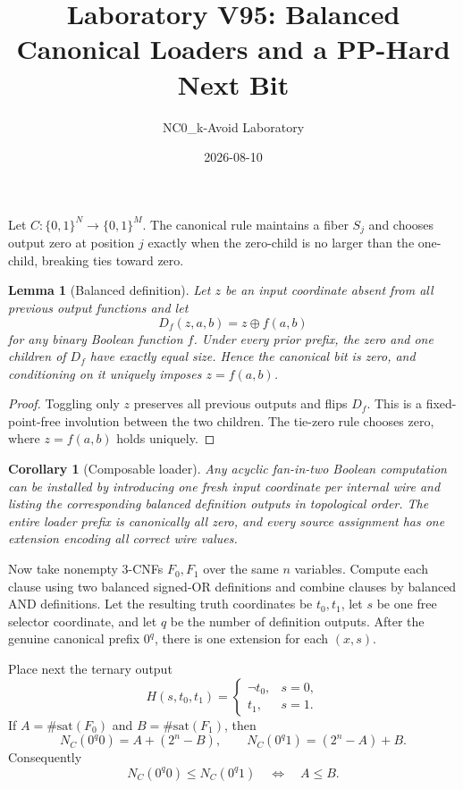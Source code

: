 \documentclass[11pt]{article}
\title{Laboratory V95: Balanced Canonical Loaders and a PP-Hard Next Bit}
\author{NC0\_k-Avoid Laboratory}
\date{2026-08-10}
\newtheorem{lemma}{Lemma}
\newtheorem{corollary}{Corollary}
\newcommand{\bits}{\{0,1\}}
\begin{document}
\maketitle

Let $C:\bits^N\to\bits^M$.  The canonical rule maintains a fiber $S_j$ and
chooses output zero at position $j$ exactly when the zero-child is no larger
than the one-child, breaking ties toward zero.

\begin{lemma}[Balanced definition]
Let $z$ be an input coordinate absent from all previous output functions and
let
\[
 D_f(z,a,b)=z\oplus f(a,b)
\]
for any binary Boolean function $f$.  Under every prior prefix, the zero and
one children of $D_f$ have exactly equal size.  Hence the canonical bit is zero,
and conditioning on it uniquely imposes $z=f(a,b)$.
\end{lemma}

\begin{proof}
Toggling only $z$ preserves all previous outputs and flips $D_f$.  This is a
fixed-point-free involution between the two children.  The tie-zero rule chooses
zero, where $z=f(a,b)$ holds uniquely.
\end{proof}

\begin{corollary}[Composable loader]
Any acyclic fan-in-two Boolean computation can be installed by introducing one
fresh input coordinate per internal wire and listing the corresponding balanced
definition outputs in topological order.  The entire loader prefix is
canonically all zero, and every source assignment has one extension encoding
all correct wire values.
\end{corollary}

Now take nonempty 3-CNFs $F_0,F_1$ over the same $n$ variables.  Compute each
clause using two balanced signed-OR definitions and combine clauses by balanced
AND definitions.  Let the resulting truth coordinates be $t_0,t_1$, let $s$ be
one free selector coordinate, and let $q$ be the number of definition outputs.
After the genuine canonical prefix $0^q$, there is one extension for each
$(x,s)$.

Place next the ternary output
\[
 H(s,t_0,t_1)=
 \begin{cases}
  \neg t_0,&s=0,\\
  t_1,&s=1.
 \end{cases}
\]
If $A=\#\mathrm{sat}(F_0)$ and $B=\#\mathrm{sat}(F_1)$, then
\[
 N_C(0^q0)=A+(2^n-B),\qquad
 N_C(0^q1)=(2^n-A)+B.
\]
Consequently
\[
 N_C(0^q0)\le N_C(0^q1)
 \quad\Longleftrightarrow\quad
 A\le B.
\]
\end{document}
